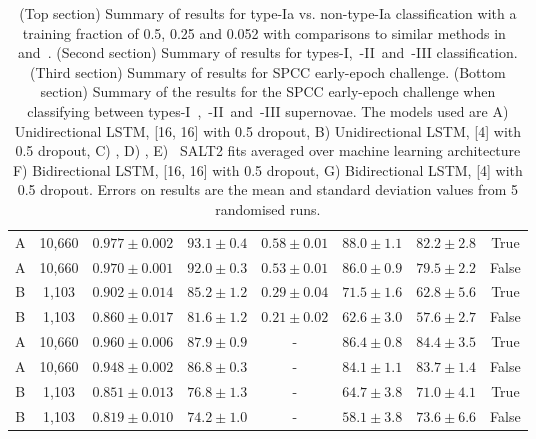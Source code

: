 \documentclass[twocolumn]{aastex61}
\begin{document}
\begin{table}[t!]
\begin{tabular}{ c  c  c  c  c  c  c  c }
A & 10,660 & $0.977 \pm 0.002$ & $93.1 \pm 0.4$ & $0.58 \pm 0.01$ & $88.0 \pm 1.1$ & $82.2 \pm 2.8$ & True\\
A & 10,660 & $0.970 \pm 0.001$ & $92.0 \pm 0.3$ & $0.53 \pm 0.01$ & $86.0 \pm 0.9$ & $79.5 \pm 2.2$ & False\\
B & 1,103 & $0.902 \pm 0.014$ & $85.2 \pm 1.2$ & $0.29 \pm 0.04$ & $71.5 \pm 1.6$ & $62.8 \pm 5.6$ & True\\
B & 1,103 & $0.860 \pm 0.017$ & $81.6 \pm 1.2$ & $0.21 \pm 0.02$ & $62.6 \pm 3.0$ & $57.6 \pm 2.7$ & False\\\hline\hline
A & 10,660 & $0.960 \pm 0.006$ & $87.9 \pm 0.9$ & - & $86.4 \pm 0.8$ & $84.4 \pm 3.5$ & True\\
A & 10,660 & $0.948 \pm 0.002$ & $86.8 \pm 0.3$ & - & $84.1 \pm 1.1$ & $83.7 \pm 1.4$ & False\\
B & 1,103 & $0.851 \pm 0.013$ & $76.8 \pm 1.3$ & - & $64.7 \pm 3.8$ & $71.0 \pm 4.1$ & True\\
B & 1,103 & $0.819 \pm 0.010$ & $74.2 \pm 1.0$ & - & $58.1 \pm 3.8$ & $73.6 \pm 6.6$ & False\\\hline\hline
\end{tabular}
\caption{\label{tab:05_SN1a} (Top section) Summary of results for  type-Ia vs. non-type-Ia classification with a training fraction of 0.5, 0.25 and 0.052 with comparisons to similar methods in~\cite{Karpenka:2012pm} and~\cite{Newling:2010bp}. (Second section) Summary of results for types-I,~-II~and~-III classification. (Third section) Summary of results for SPCC early-epoch challenge. (Bottom section) Summary of the results for the SPCC early-epoch challenge when classifying between types-I~,~-II~and~-III supernovae. The models used are A) Unidirectional LSTM, [16, 16] with 0.5 dropout, B) Unidirectional LSTM, [4] with 0.5 dropout, C) \cite{Karpenka:2012pm}, D) \cite{Newling:2010bp}, E) \cite{Lochner:2016hbn}~SALT2 fits averaged over machine learning architecture F) Bidirectional LSTM, [16, 16] with 0.5 dropout, G) Bidirectional LSTM, [4] with 0.5 dropout. Errors on results are the mean and standard deviation values from 5 randomised runs.}
\end{table}
\end{document}
